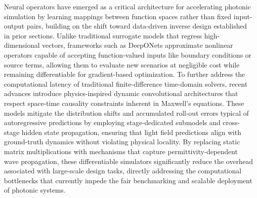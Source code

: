 \documentclass[11pt]{article}
\begin{document}
Neural operators have emerged as a critical architecture for accelerating photonic simulation by learning mappings between function spaces rather than fixed input-output pairs, building on the shift toward data-driven inverse design established in prior sections. Unlike traditional surrogate models that regress high-dimensional vectors, frameworks such as DeepONets approximate nonlinear operators capable of accepting function-valued inputs like boundary conditions or source terms, allowing them to evaluate new scenarios at negligible cost while remaining differentiable for gradient-based optimization. \citep{doi_10_48550_arxiv_2406_05072_c02ad5f4} \citep{doi_10_1122_8_0000908_e28c4124} To further address the computational latency of traditional finite-difference time-domain solvers, recent advances introduce physics-inspired dynamic convolutional architectures that respect space-time causality constraints inherent in Maxwell's equations. These models mitigate the distribution shifts and accumulated roll-out errors typical of autoregressive predictions by employing stage-dedicated submodels and cross-stage hidden state propagation, ensuring that light field predictions align with ground-truth dynamics without violating physical locality. By replacing static matrix multiplications with mechanisms that capture permittivity-dependent wave propagation, these differentiable simulators significantly reduce the overhead associated with large-scale design tasks, directly addressing the computational bottlenecks that currently impede the fair benchmarking and scalable deployment of photonic systems. \citep{doi_10_48550_arxiv_2601_00199_c689b34d} \citep{doi_10_48550_arxiv_2406_17810_813bd2a3}
\end{document}
